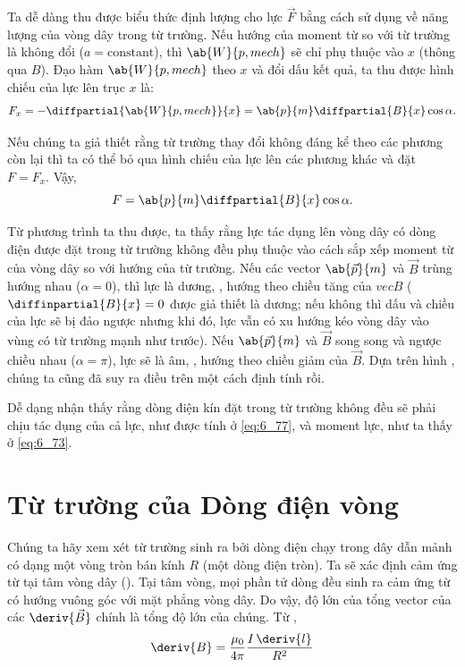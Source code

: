 Ta dễ dàng thu được biểu thức định lượng cho lực $\vec{F}$ bằng cách sử dụng  về năng lượng của vòng dây trong từ trường. Nếu hướng của moment từ so với từ trường là không đổi ($a=\text{constant}$), thì $\ab{W}{p,mech}$ sẽ chỉ phụ thuộc vào $x$ (thông qua $B$). Đạo hàm $\ab{W}{p,mech}$ theo $x$ và đổi dấu kết quả, ta thu được hình chiếu của lực lên trục $x$ là:
\begin{equation*}
    F_x = - \diffpartial{\ab{W}{p,mech}}{x} = \ab{p}{m} \diffpartial{B}{x} \cos\alpha.
\end{equation*}

\noindent
Nếu chúng ta giả thiết rằng từ trường thay đổi không đáng kể theo các phương còn lại thì ta có thể bỏ qua hình chiếu của lực lên các phương khác và đặt $F=F_x$. Vậy,
\begin{equation}\label{eq:6_77}
    F = \ab{p}{m} \diffpartial{B}{x} \cos\alpha.
\end{equation}

Từ phương trình ta thu được, ta thấy rằng lực tác dụng lên vòng dây có dòng điện được đặt trong từ trường không đều phụ thuộc vào cách sắp xếp moment từ của vòng dây so với hướng của từ trường. Nếu các vector $\ab{\vec{p}}{m}$ và $\vec{B}$ trùng hướng nhau ($\alpha=0$), thì lực là dương, \ie, hướng theo chiều tăng của $vec{B}$ ($\diffinpartial{B}{x}=0$ được giả thiết là dương; nếu không thì dấu và chiều của lực sẽ bị đảo ngược nhưng khi đó, lực vẫn có xu hướng kéo vòng dây vào vùng có từ trường mạnh như trước). Nếu $\ab{\vec{p}}{m}$ và $\vec{B}$ song song và ngược chiều nhau ($\alpha=\pi$), lực sẽ là âm, \ie, hướng theo chiều giảm của $\vec{B}$. Dựa trên hình , chúng ta cũng đã suy ra điều trên một cách định tính rồi.

Dễ dạng nhận thấy rằng dòng điện kín đặt trong từ trường không đều sẽ phải chịu tác dụng của cả lực, như được tính ở \eqref{eq:6_77}, và moment lực, như ta thấy ở \eqref{eq:6_73}.

\section{Từ trường của Dòng điện vòng}\label{sec:6_9}

Chúng ta hãy xem xét từ trường sinh ra bởi dòng điện chạy trong dây dẫn mảnh có dạng một vòng tròn bán kính $R$ (một dòng điện tròn). Ta sẽ xác định cảm ứng từ tại tâm vòng dây (). Tại tâm vòng, mọi phần tử dòng đều sinh ra cảm ứng từ có hướng vuông góc với mặt phẳng vòng dây. Do vậy, độ lớn của tổng vector của các $\deriv{\vec{B}}$ chính là tổng độ lớn của chúng. Từ ,
\begin{equation*}
    \deriv{B} = \frac{\mu_0}{4\pi} \frac{I\, \deriv{l}}{R^2}
\end{equation*}


